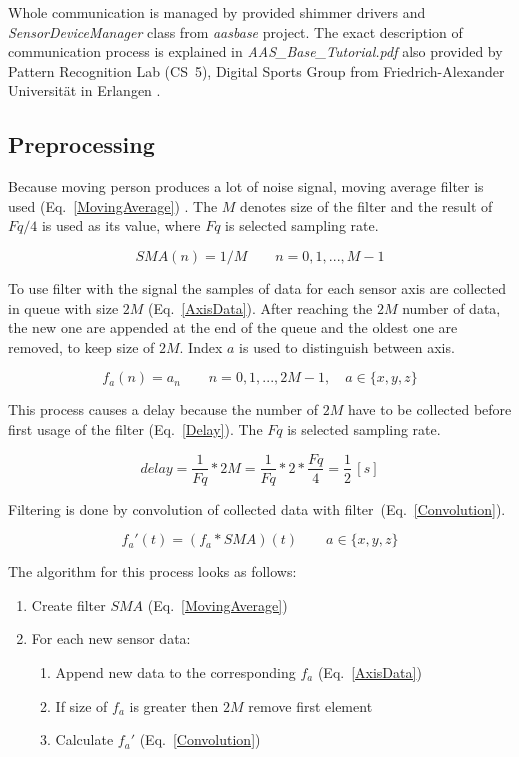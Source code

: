 \documentclass[conference]{IEEEtran}
\begin{document}
Whole communication is managed by provided shimmer drivers and \emph{SensorDeviceManager} class from \emph{aasbase} project. The exact description of communication process is explained in \emph{AAS\_Base\_Tutorial.pdf} also provided by Pattern Recognition Lab (CS~5), Digital Sports Group from Friedrich-Alexander Universität in Erlangen \cite{CS5}.


\subsection{Preprocessing}
Because moving person produces a lot of noise signal, moving average filter is used (Eq.~\ref{MovingAverage}) \cite{MovingAverage}.
The $M$ denotes size of the filter and the result of $Fq/4$ is used as its value, where $Fq$ is selected sampling rate.

\begin{equation}
	SMA(n) = 1/M\qquad  n = 0, 1, ..., M - 1
	\label{MovingAverage}
\end{equation}

To use filter with the signal the samples of data for each sensor axis are collected in queue with size  $2M$ (Eq.~\ref{AxisData}).
After reaching the $2M$ number of data, the new one are appended at the end of the queue and the oldest one are removed, to keep size of $2M$.
Index $a$ is used to distinguish between axis.

\begin{equation}
    f_a(n) = a_n\qquad n = 0, 1, ..., 2M - 1,\quad a \in \{x, y, z\}
    \label{AxisData}
\end{equation}

This process causes a delay because the number of $2M$ have to be collected before first usage of the filter (Eq.~\ref{Delay}). The $Fq$ is selected sampling rate.

\begin{equation}
    delay = \frac{1}{Fq} * 2M = \frac{1}{Fq} * 2 * \frac{Fq}{4} = \frac{1}{2}\,[s]
    \label{Delay}
\end{equation}

Filtering is done by convolution of collected data with filter~(Eq.~\ref{Convolution}).

\begin{equation}
    f_a'(t) = (f_a \ast SMA)(t) \qquad a \in \{x, y, z\}
    \label{Convolution}
\end{equation}

The algorithm for this process looks as follows:
\begin{enumerate}
    \item Create filter $SMA$ (Eq.~\ref{MovingAverage})
    \item For each new sensor data:
    \begin{enumerate}
        \item Append new data to the corresponding $f_a$ (Eq.~\ref{AxisData})
        \item If size of $f_a$ is greater then $2M$ remove first element
        \item Calculate $f_a'$ (Eq.~\ref{Convolution})
    \end{enumerate}
\end{enumerate}
\end{document}
